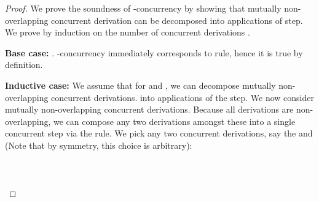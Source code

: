 \documentclass{tlp}
\begin{document}
\begin{proof}
  We prove the soundness of -concurrency by showing that  mutually non-overlapping 
  concurrent derivation can be decomposed into  applications of  
  step. We prove by induction on the number of concurrent derivations .
  
  {\bf Base case:} . -concurrency immediately corresponds to 
  rule, hence it is true by definition.
  
  {\bf Inductive case:} We assume that for  and , we can decompose  mutually 
  non-overlapping concurrent derivations. into  applications of the  step. 
  We now consider  mutually non-overlapping concurrent derivations. Because all derivations are
  non-overlapping, we can compose any two derivations amongst these  into a single concurrent 
  step via the  rule. We pick any two concurrent derivations, say the  
  and  (Note that by symmetry, this choice is arbitrary):
  {\small
    \\ \\
   
    \\ \\
   
}
\end{proof}
\end{document}

